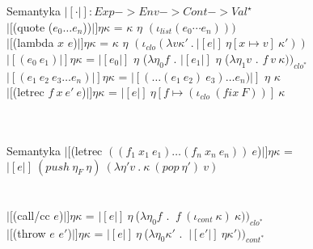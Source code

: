 \documentclass[12pt,serif]{beamer}
\begin{document}
\begin{frame}{Semantyka}
$|[ \cdot |]: Exp -> Env -> Cont -> Val^{\star}$ \newline
\\
$|[$(quote ($e_0 \ldots e_n$))$|] \eta \kappa$ =
  $\kappa$ $\eta$ $(\iota_{list} (e_0 \cdots e_n)))$ \newline
\\
$|[$(lambda $x$ $e$)$|] \eta \kappa$ =
  $\kappa$ $\eta$ $(\iota_{clo} (\lambda v \kappa'~.~ |[e|]~\eta[x \mapsto v]~\kappa' ))$ \newline
\\
$|[(e_0~e_1)|] \eta \kappa$ =
  $|[e_0|]$ $\eta$ ($\lambda \eta_0 f$ .
  $|[e_1|]$ $\eta$ ($\lambda \eta_1 v$ . $f~v~\kappa))_{clo^{*}}$ \newline
\\
$|[(e_1~e_2~e_3 \ldots e_n)|] \eta \kappa$ =
  $|[ (\ldots(e_1~e_2)~e_3) \ldots e_n) |]$ $\eta$ $\kappa$ \newline
\\
$|[$(letrec $f~x~e'~e$)$|] \eta \kappa$ = $|[e|]~\eta[f \mapsto (\iota_{clo}~(fix~F))]~\kappa$ \\
\hspace{1em}{gdzie:} \\
 \\
\end{frame}

\begin{frame}{Semantyka}
\color{red}
$|[$(letrec $((f_1~x_1~e_1) \ldots (f_n~x_n~e_n)) ~e$)$|] \eta \kappa$ = \\
\hspace{1em}$|[e|]~ (push ~ \eta_F ~ \eta)~(\lambda \eta' v ~ . ~ \kappa ~ (pop ~\eta') ~ v)$ \\
\hspace{2em}{gdzie:} \\
\hspace{3em}{ $\eta_F$ = ??? } \newline
\\
$|[$(call/cc $e$)$|] \eta \kappa$ =
  $|[e|] ~ \eta ~ $($\lambda \eta_0 f$ .
  $~ f ~ (\iota_{cont}~{\kappa}) ~ \kappa))_{clo^{*}}$ \newline
\\
$|[$(throw $e$ $e'$)$|] \eta \kappa$ =
  $|[e|] ~ \eta ~ $($\lambda \eta_0 \kappa'$ .
  $~ |[e'|] ~ \eta \kappa'))_{cont^{*}}$ \newline


\end{frame}
\end{document}
